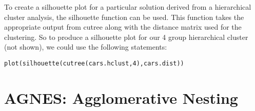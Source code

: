 {To create a silhouette plot for a particular solution derived from a hierarchical cluster analysis, the silhouette function can be used. This function takes the appropriate output from cutree along with the distance matrix used for the clustering. So to produce a silhouette plot for our 4 group hierarchical cluster (not shown), we could use the following statements:
\begin{framed}
\begin{verbatim}
plot(silhouette(cutree(cars.hclust,4),cars.dist))
\end{verbatim}
\end{framed}
\newpage
\section{AGNES: Agglomerative Nesting}

}
